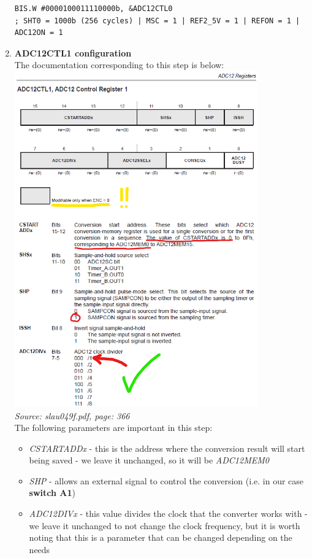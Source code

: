 \documentclass{article}
\begin{document}
\begin{enumerate}[label=\arabic*.]
\begin{verbatim}
BIS.W #0000100011110000b, &ADC12CTL0
; SHT0 = 1000b (256 cycles) | MSC = 1 | REF2_5V = 1 | REFON = 1 | ADC12ON = 1 \end{verbatim}
    \item \textbf{ADC12CTL1 configuration}
    \vspace{3mm} \\
The documentation corresponding to this step is below: \\
\includegraphics[width=0.825\textwidth]{"../img/slau049f_366.png"} \\
\textit{Source: slau049f.pdf, page: 366}
\vspace{3mm} \\
The following parameters are important in this step:
\begin{itemize}
     \item \textit{CSTARTADDx} - this is the address where the conversion result will start being saved - we leave it unchanged, so it will be \textit{ADC12MEM0}
     \item \textit{SHP} - allows an external signal to control the conversion (i.e. in our case \textbf{switch A1})
     \item \textit{ADC12DIVx} - this value divides the clock that the converter works with - we leave it unchanged to not change the clock frequency, but it is worth noting that this is a parameter that can be changed depending on the needs

\end{itemize}
\end{enumerate}
\end{document}
